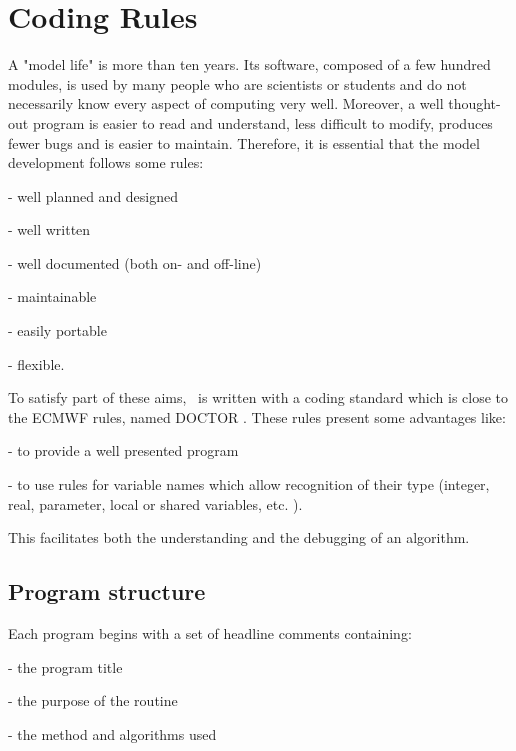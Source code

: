 \documentclass[../main/NEMO_manual]{subfiles}
\begin{document}
\chapter{Coding Rules}
\label{apdx:D}

\minitoc

\newpage

A "model life" is more than ten years.
Its software, composed of a few hundred modules, is used by many people who are scientists or students and
do not necessarily know every aspect of computing very well.
Moreover, a well thought-out program is easier to read and understand, less difficult to modify,
produces fewer bugs and is easier to maintain.
Therefore, it is essential that the model development follows some rules:

- well planned and designed

- well written

- well documented (both on- and off-line)

- maintainable

- easily portable

- flexible.

To satisfy part of these aims, \NEMO\ is written with a coding standard which is close to the ECMWF rules,
named DOCTOR \citep{gibson_trpt86}. 
These rules present some advantages like:

- to provide a well presented program

- to use rules for variable names which allow recognition of their type
(integer, real, parameter, local or shared variables, etc. ). 

This facilitates both the understanding and the debugging of an algorithm.

\section{Program structure}
\label{sec:D_structure}

Each program begins with a set of headline comments containing:

- the program title

- the purpose of the routine

- the method and algorithms used
\end{document}
